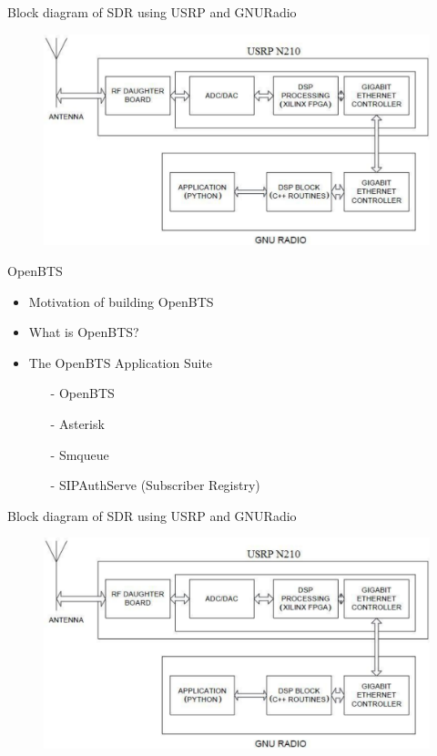 \documentclass{beamer}
\begin{document}
  \begin{frame}{Block diagram of SDR using USRP and GNURadio}
    \begin{figure}
      \centering
      \includegraphics[width=\linewidth]{img/usrpGNURadioBlock}
    \end{figure}
  \end{frame}

  \begin{frame}{OpenBTS}
    \begin{itemize}
      \item Motivation of  building OpenBTS
      \item What is OpenBTS?
      \item The OpenBTS Application Suite
        \begin{itemize}
          \item[-] OpenBTS
          \item[-] Asterisk
          \item[-] Smqueue
          \item[-] SIPAuthServe (Subscriber Registry)
        \end{itemize}
    \end{itemize}
  \end{frame}
  \begin{frame}{Block diagram of SDR using USRP and GNURadio}
    \begin{figure}
      \centering
      \includegraphics[width=\linewidth]{img/usrpGNURadioBlock}
    \end{figure}
  \end{frame}
\end{document}
